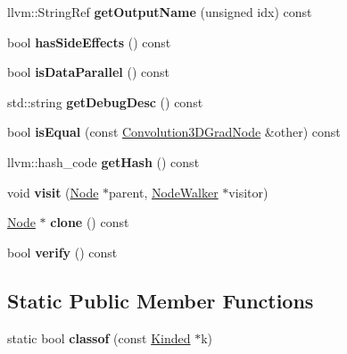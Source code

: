 \begin{DoxyCompactItemize}
llvm\+::\+String\+Ref {\bfseries get\+Output\+Name} (unsigned idx) const
\item 
\mbox{\label{classglow_1_1_convolution3_d_grad_node_a6e80c55ca662e0d7c1bd037fc57ee436}} 
bool {\bfseries has\+Side\+Effects} () const
\item 
\mbox{\label{classglow_1_1_convolution3_d_grad_node_a5f8ec5474e94df466bda74d9e3f5c90c}} 
bool {\bfseries is\+Data\+Parallel} () const
\item 
\mbox{\label{classglow_1_1_convolution3_d_grad_node_a681a3e2ebcc7ab0cd37e61841bd2c2a5}} 
std\+::string {\bfseries get\+Debug\+Desc} () const
\item 
\mbox{\label{classglow_1_1_convolution3_d_grad_node_aeffa7776749cb4396c53e5033ee840e8}} 
bool {\bfseries is\+Equal} (const \hyperlink{classglow_1_1_convolution3_d_grad_node}{Convolution3\+D\+Grad\+Node} \&other) const
\item 
\mbox{\label{classglow_1_1_convolution3_d_grad_node_ae2477f2128e8f32d75c49c4a2c72ecaf}} 
llvm\+::hash\+\_\+code {\bfseries get\+Hash} () const
\item 
\mbox{\label{classglow_1_1_convolution3_d_grad_node_a7701c556be41a25226cfe89fbb0f59b0}} 
void {\bfseries visit} (\hyperlink{classglow_1_1_node}{Node} $\ast$parent, \hyperlink{classglow_1_1_node_walker}{Node\+Walker} $\ast$visitor)
\item 
\mbox{\label{classglow_1_1_convolution3_d_grad_node_aeb691030806160679d5c11d0d5226596}} 
\hyperlink{classglow_1_1_node}{Node} $\ast$ {\bfseries clone} () const
\item 
\mbox{\label{classglow_1_1_convolution3_d_grad_node_a12e0d300efd9125ab23cfa4deddefebf}} 
bool {\bfseries verify} () const
\end{DoxyCompactItemize}
\subsection*{Static Public Member Functions}
\begin{DoxyCompactItemize}
\item 
\mbox{\label{classglow_1_1_convolution3_d_grad_node_a49aa8ae44591d865efff68889e6adc1b}} 
static bool {\bfseries classof} (const \hyperlink{classglow_1_1_kinded}{Kinded} $\ast$k)
\end{DoxyCompactItemize}
